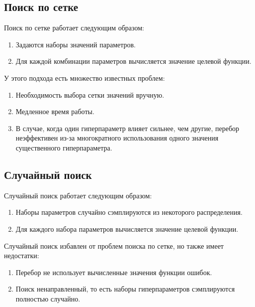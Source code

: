 \documentclass[a4paper,12pt]{article}
\begin{document}
\subsection{Поиск по сетке}
Поиск по сетке работает следующим образом:
\begin{enumerate}
    \item Задаются наборы значений параметров.
    \item Для каждой комбинации параметров вычисляется значение целевой функции.
\end{enumerate}

У этого подхода есть множество известных проблем:
\begin{enumerate}
    \item Необходимость выбора сетки значений вручную.
    \item Медленное время работы.
    \item В случае, когда один гиперпараметр влияет сильнее, чем другие, перебор неэффективен из-за многократного использования одного значения существенного гиперпараметра.
\end{enumerate}


\subsection{Случайный поиск}
Случайный поиск работает следующим образом:
\begin{enumerate}
    \item Наборы параметров случайно сэмплируются из некоторого распределения.
    \item Для каждого набора параметров вычисляется значение целевой функции.
\end{enumerate}

Случайный поиск избавлен от проблем поиска по сетке, но также имеет недостатки:
\begin{enumerate}
    \item Перебор не использует вычисленные значения функции ошибок.
    \item Поиск ненаправленный, то есть наборы гиперпараметров сэмплируются полностью случайно.
\end{enumerate}
\end{document}
